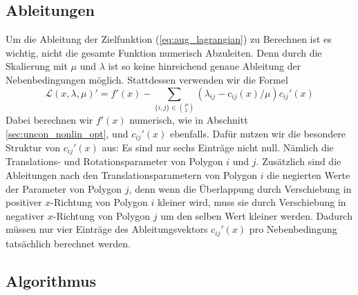 \documentclass[runningheads,a4paper]{llncs}
\begin{document}
\subsection{Ableitungen}
Um die Ableitung der Zielfunktion (\ref{eq:aug_lagrangian}) zu Berechnen ist es wichtig, nicht die gesamte Funktion numerisch Abzuleiten. Denn durch die Skalierung mit $\mu$ und $\lambda$ ist so keine hinreichend genaue Ableitung der Nebenbedingungen möglich. Stattdessen verwenden wir die Formel \cite{nocedal1999numerical}
\begin{equation*}
\mathcal{L}(x,\lambda,\mu)' = f'(x) - \sum_{\{i,j\}\in {P \choose 2}}(\lambda_{ij} - c_{ij}(x)/\mu) c_{ij}'(x)
\end{equation*}
Dabei berechnen wir $f'(x)$ numerisch, wie in Abschnitt \ref{sec:uncon_nonlin_opt}, und $c_{ij}'(x)$ ebenfalls. Dafür nutzen wir die besondere Struktur von $c_{ij}'(x)$ aus: Es sind nur sechs Einträge nicht null. Nämlich die Translations- und Rotationsparameter von Polygon $i$ und $j$. Zusätzlich sind die Ableitungen nach den Translationsparametern von Polygon $i$ die negierten Werte der Parameter von Polygon $j$, denn wenn die Überlappung durch Verschiebung in positiver $x$-Richtung von Polygon $i$ kleiner wird, muss sie durch Verschiebung in negativer $x$-Richtung von Polygon $j$ um den selben Wert kleiner werden. Dadurch müssen nur vier Einträge des Ableitungsvektors $c_{ij}'(x)$ pro Nebenbedingung tatsächlich berechnet werden.

\subsection{Algorithmus}
\end{document}
